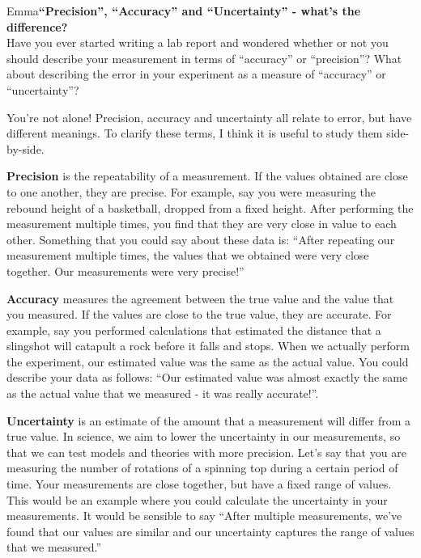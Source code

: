 \begin{studentOpinion}{Emma}{\textbf{``Precision'', ``Accuracy'' and ``Uncertainty'' - what's the difference?}}
\\Have you ever started writing a lab report and wondered whether or not you should describe your measurement in terms of ``accuracy'' or ``precision''? What about describing the error in your experiment as a measure of ``accuracy'' or ``uncertainty''? 

You're not alone! Precision, accuracy and uncertainty all relate to error, but have different meanings. To clarify these terms, I think it is useful to study them side-by-side.

\textbf{Precision}
 is the repeatability of a measurement. If the values obtained are close to one another, they are precise. For example, say you were measuring the rebound height of a basketball, dropped from a fixed height. After performing the measurement multiple times, you find that they are very close in value to each other. Something that you could say about these data is: ``After repeating our measurement multiple times, the values that we obtained were very close together. Our measurements were very precise!''

\textbf{Accuracy}
 measures the agreement between the true value and the value that you measured. If the values are close to the true value, they are accurate. For example, say you performed calculations that estimated the distance that a slingshot will catapult a rock before it falls and stops. When we actually perform the experiment, our estimated value was the same as the actual value. You could describe your data as follows: ``Our estimated value was almost exactly the same as the actual value that we measured - it was really accurate!''.

\textbf{Uncertainty}
is an estimate of the amount that a measurement will differ from a true value. In science, we aim to lower the uncertainty in our measurements, so that we can test models and theories with more precision. Let's say that you are measuring the number of rotations of a spinning top during a certain period of time. Your measurements are close together, but have a fixed range of values. This would be an example where you could calculate the uncertainty in your measurements. It would be sensible to say ``After multiple measurements, we've found that our values are similar and our uncertainty captures the range of values that we measured.''
\end{studentOpinion}






